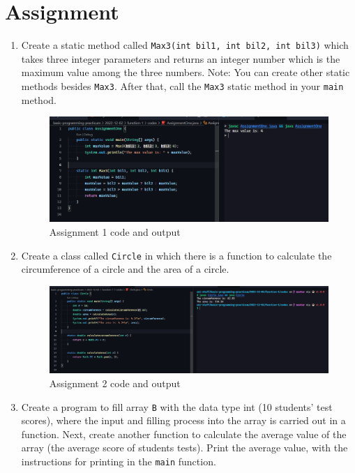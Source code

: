\documentclass[12pt,titlepage]{article}
\begin{document}
\section{Assignment}
\begin{enumerate}
    \item {
        Create a static method called \texttt{Max3(int bil1, int bil2, int bil3)} which takes
        three integer parameters and returns an integer number which is the maximum value among
        the three numbers. Note: You can create other static methods besides \texttt{Max3}.
        After that, call the \texttt{Max3} static method in your \texttt{main} method.

        \begin{figure}[h]
            \centering
            \includegraphics[width=\textwidth]{./images/assignment-one.png}
            \caption{Assignment 1 code and output}
        \end{figure}
    }
    \pagebreak
    \item {
        Create a class called \texttt{Circle} in which there is a function to calculate the circumference
        of a circle and the area of a circle.

        \begin{figure}[h]
            \centering
            \includegraphics[width=\textwidth]{./images/assignment-two.png}
            \caption{Assignment 2 code and output}
        \end{figure}
    }
    \item {
        Create a program to fill array \texttt{B} with the data type int (10 students' test scores),
        where the input and filling process into the array is carried out in a function. Next, create
        another function to calculate the average value of the array (the average score of students tests).
        Print the average value, with the instructions for printing in the \texttt{main} function.

}
\end{enumerate}
\end{document}
